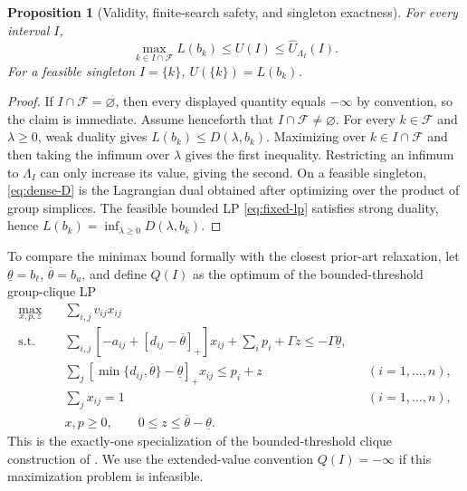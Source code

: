 \documentclass[11pt]{article}
\theoremstyle{plain}
\newtheorem{proposition}[theorem]{Proposition}
\theoremstyle{definition}
\theoremstyle{remark}
\newcommand{\pos}[1]{[#1]_+}
\begin{document}
\begin{proposition}[Validity, finite-search safety, and singleton exactness]\label{prop:validity}
For every interval $I$,
\[
\max_{k\in I\cap\mathcal F}L(b_k)\le U(I)\le\widehat U_{\Lambda_I}(I).
\]
For a feasible singleton $I=\{k\}$, $U(\{k\})=L(b_k)$.
\end{proposition}
\begin{proof}
If $I\cap\mathcal F=\varnothing$, then every displayed quantity equals $-\infty$ by convention, so the claim is immediate.  Assume henceforth that $I\cap\mathcal F\ne\varnothing$.
For every $k\in\mathcal F$ and $\lambda\ge0$, weak duality gives $L(b_k)\le D(\lambda,b_k)$.  Maximizing over $k\in I\cap\mathcal F$ and then taking the infimum over $\lambda$ gives the first inequality.  Restricting an infimum to $\Lambda_I$ can only increase its value, giving the second.  On a feasible singleton, \eqref{eq:dense-D} is the Lagrangian dual obtained after optimizing over the product of group simplices.  The feasible bounded LP \eqref{eq:fixed-lp} satisfies strong duality, hence $L(b_k)=\inf_{\lambda\ge0}D(\lambda,b_k)$.
\end{proof}

To compare the minimax bound formally with the closest prior-art relaxation, let
$\underline\theta=b_\ell$, $\overline\theta=b_u$, and define $Q(I)$ as the optimum of the bounded-threshold group-clique LP
\begin{align}
\max_{x,p,z}\quad &\sum_{i,j}v_{ij}x_{ij} \label{eq:clique-main}\\
\text{s.t.}\quad
&\sum_{i,j}\left[-a_{ij}+\pos{d_{ij}-\overline\theta}\right]x_{ij}
 +\sum_i p_i+\Gamma z\le-\Gamma\underline\theta,\nonumber\\
&\sum_j\pos{\min\{d_{ij},\overline\theta\}-\underline\theta}x_{ij}
 \le p_i+z &&(i=1,\ldots,n),\nonumber\\
&\sum_jx_{ij}=1 &&(i=1,\ldots,n),\nonumber\\
&x,p\ge0,\qquad 0\le z\le\overline\theta-\underline\theta.\nonumber
\end{align}
This is the exactly-one specialization of the bounded-threshold clique construction of \citet{BusingGersingKoster2023}.  We use the extended-value convention $Q(I)=-\infty$ if this maximization problem is infeasible.
\end{document}

